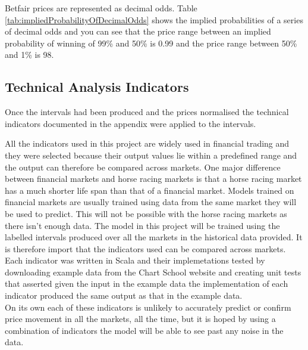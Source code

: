 			Betfair prices are represented as decimal odds. Table \ref{tab:impliedProbabilityOfDecimalOdds} shows the implied probabilities of a series of decimal odds and you can see that the price range between an implied probability of winning of 99\% and 50\% is 0.99 and the price range between 50\% and 1\% is 98. 
			
				
		\subsection{Technical Analysis Indicators}
				Once the intervals had been produced and the prices normalised the technical indicators documented in the appendix were applied to the intervals.
			
						
			All the indicators used in this project are widely used in financial trading and they were selected because their output values lie within a predefined range and the output can therefore be compared across markets. One major difference between financial markets and horse racing markets is that a horse racing market has a much shorter life span than that of a financial market. Models trained on financial markets are usually trained using data from the same market they will be used to predict. This will not be possible with the horse racing markets as there isn't enough data. The model in this project will be trained using the labelled intervals produced over all the markets in the historical data provided. It is therefore import that the indicators used can be compared across markets.\\
			
			Each indicator was written in Scala and their implemetations tested by downloading example data from the Chart School website\cite{technicalIndicators} and creating unit tests that asserted given the input in the example data the implementation of each indicator produced the same output as that in the example data.\\ 
			  
			On its own each of these indicators is unlikely to accurately predict or confirm price movement in all the markets, all the time, but it is hoped by using a combination of indicators the model will be able to see past any noise in the data.\\			
		
